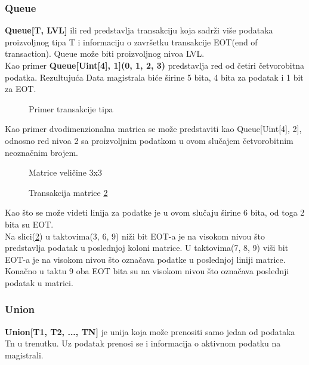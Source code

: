 \subsubsection{Queue} \label{queue_sec}
\textbf{Queue[T, LVL]} ili red predstavlja transakciju koja sadrži više
  podataka proizvoljnog tipa T i informaciju o završetku transakcije EOT(end of
  transaction).
  Queue može biti proizvoljnog nivoa LVL. \\
  Kao primer \textbf{Queue[Uint[4], 1](0, 1, 2, 3)} predstavlja red od četiri
  četvorobitna podatka.
  Rezultujuća Data magistrala biće širine 5 bita, 4 bita za podatak i 1 bit za EOT.
\begin{figure}[H]
\centering{
  \scalebox{1.2}{
    
  }}
\caption{Primer transakcije tipa}
\label{queue_img1}
\end{figure}

Kao primer dvodimenzionalna matrica se može predstaviti kao Queue[Uint[4], 2],
odnosno red nivoa 2 sa proizvoljnim podatkom u ovom slučajem četvorobitnim
neoznačnim brojem.

\begin{figure}[H]
\centering{
  \scalebox{0.9}{
    
  }}
\caption{Matrice veličine 3x3}
\label{queue_matrix1}
\end{figure}

\begin{figure}[H]
\centering{
  \scalebox{1.2}{
    
  }}
\caption{Transakcija matrice \ref{queue_matrix1}}
\label{queue_matrix2}
\end{figure}

Kao što se može videti linija za podatke je u ovom slučaju širine 6 bita, od
toga 2 bita su EOT. \\
Na slici(\ref{queue_matrix1}) u taktovima(3, 6, 9) niži bit EOT-a je na visokom nivou
što predstavlja podatak u poslednjoj koloni matrice.
U taktovima(7, 8, 9) viši bit EOT-a je na visokom nivou što označava podatke u poslednjoj
liniji matrice.
Konačno u taktu 9 oba EOT bita su na visokom nivou što označava poslednji podatak u matrici.

\subsubsection{Union} \label{union_sec}
\textbf{Union[T1, T2, ..., TN]} je unija koja može prenositi samo jedan od
  podataka Tn u trenutku.
  Uz podatak prenosi se i informacija o aktivnom podatku na magistrali.

